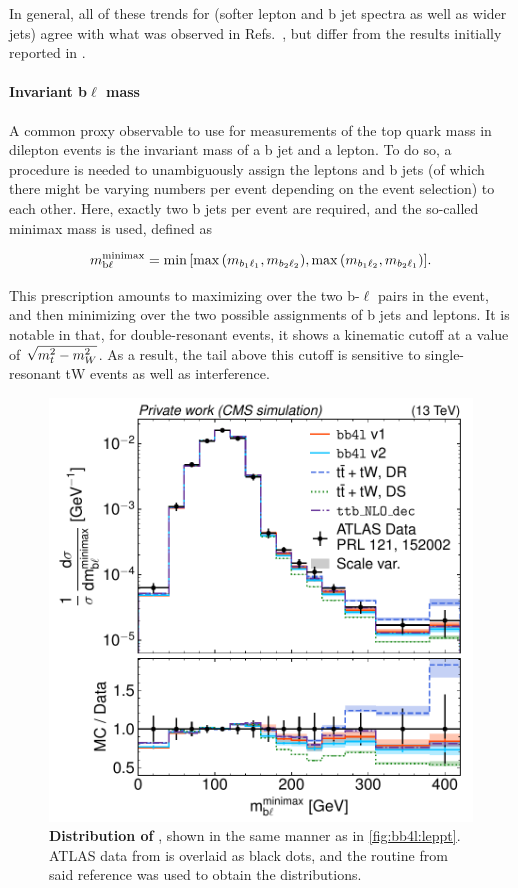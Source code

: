 In general, all of these trends for \bbfourl (softer lepton and b jet spectra as well as wider jets) agree with what was observed in Refs.~\cite{FerrarioRavasio:2018whr,ATLAS:PHYS-PUB-2021-042}, but differ from the results initially reported in .

\paragraph{Invariant b$\ell$ mass} A common proxy observable to use for measurements of the top quark mass in dilepton events is the invariant mass \mbl of a b jet and a lepton. To do so, a procedure is needed to unambiguously assign the leptons and b jets (of which there might be varying numbers per event depending on the event selection) to each other. Here, exactly two b jets per event are required, and the so-called minimax mass is used, defined as

\begin{equation}
    m_{\mathrm{b \ell}}^{\mathrm{minimax}} = \min{ \left[  \max{ \left( m_{b_1 \ell_1},
          m_{b_2 \ell_2} \right) }, \max{ \left( m_{b_1 \ell_2},
          m_{b_2 \ell_1} \right) } \right] }.
\end{equation}

This prescription amounts to maximizing over the two b-$\ell$ pairs in the event, and then minimizing over the two possible assignments of b jets and leptons. It is notable in that, for double-resonant \ttbar events, it shows a kinematic cutoff at a value of $\sqrt{\smash[b]{m_t^2 - m_W^2}}$. As a result, the tail above this cutoff is sensitive to single-resonant tW events as well as \tttW interference.

\begin{figure}[tp]
    \centering
    \includegraphics[width=0.49 \textwidth]{figures/bb4l/generators/ATLAS_2018_I1677498_d03-x01-y01.pdf}
    \caption{\textbf{Distribution of \mblminimax}, shown in the same manner as in \cref{fig:bb4l:leppt}. ATLAS data from  is overlaid as black dots, and the \rivet routine from said reference was used to obtain the distributions.}
    \label{fig:bb4l:mbl}
\end{figure}

